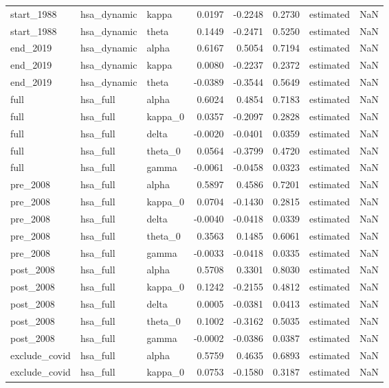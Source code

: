 \begin{tabular}{lllrrrlr}
start\_1988 & hsa\_dynamic & kappa & 0.0197 & -0.2248 & 0.2730 & estimated & NaN \\
start\_1988 & hsa\_dynamic & theta & 0.1449 & -0.2471 & 0.5250 & estimated & NaN \\
end\_2019 & hsa\_dynamic & alpha & 0.6167 & 0.5054 & 0.7194 & estimated & NaN \\
end\_2019 & hsa\_dynamic & kappa & 0.0080 & -0.2237 & 0.2372 & estimated & NaN \\
end\_2019 & hsa\_dynamic & theta & -0.0389 & -0.3544 & 0.5649 & estimated & NaN \\
full & hsa\_full & alpha & 0.6024 & 0.4854 & 0.7183 & estimated & NaN \\
full & hsa\_full & kappa\_0 & 0.0357 & -0.2097 & 0.2828 & estimated & NaN \\
full & hsa\_full & delta & -0.0020 & -0.0401 & 0.0359 & estimated & NaN \\
full & hsa\_full & theta\_0 & 0.0564 & -0.3799 & 0.4720 & estimated & NaN \\
full & hsa\_full & gamma & -0.0061 & -0.0458 & 0.0323 & estimated & NaN \\
pre\_2008 & hsa\_full & alpha & 0.5897 & 0.4586 & 0.7201 & estimated & NaN \\
pre\_2008 & hsa\_full & kappa\_0 & 0.0704 & -0.1430 & 0.2815 & estimated & NaN \\
pre\_2008 & hsa\_full & delta & -0.0040 & -0.0418 & 0.0339 & estimated & NaN \\
pre\_2008 & hsa\_full & theta\_0 & 0.3563 & 0.1485 & 0.6061 & estimated & NaN \\
pre\_2008 & hsa\_full & gamma & -0.0033 & -0.0418 & 0.0335 & estimated & NaN \\
post\_2008 & hsa\_full & alpha & 0.5708 & 0.3301 & 0.8030 & estimated & NaN \\
post\_2008 & hsa\_full & kappa\_0 & 0.1242 & -0.2155 & 0.4812 & estimated & NaN \\
post\_2008 & hsa\_full & delta & 0.0005 & -0.0381 & 0.0413 & estimated & NaN \\
post\_2008 & hsa\_full & theta\_0 & 0.1002 & -0.3162 & 0.5035 & estimated & NaN \\
post\_2008 & hsa\_full & gamma & -0.0002 & -0.0386 & 0.0387 & estimated & NaN \\
exclude\_covid & hsa\_full & alpha & 0.5759 & 0.4635 & 0.6893 & estimated & NaN \\
exclude\_covid & hsa\_full & kappa\_0 & 0.0753 & -0.1580 & 0.3187 & estimated & NaN \\

\end{tabular}
